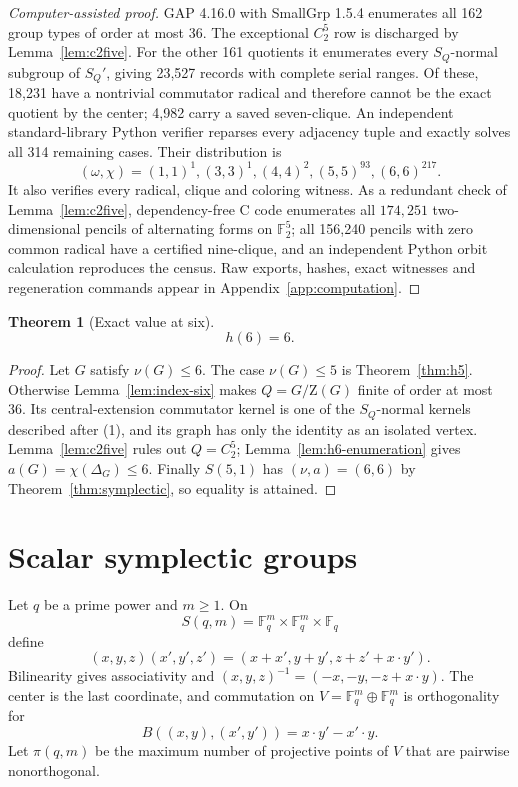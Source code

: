 \documentclass[11pt]{article}
\newtheorem{theorem}{Theorem}[section]
\theoremstyle{remark}
\newcommand{\nuG}{\nu}
\newcommand{\aG}{a}
\newcommand{\F}{\mathbb F}
\newcommand{\Z}{\mathrm Z}
\begin{document}
\begin{proof}[Computer-assisted proof]
GAP 4.16.0 with SmallGrp 1.5.4 enumerates all 162 group types of order at
most 36.  The exceptional $C_2^5$ row is discharged by
Lemma~\ref{lem:c2five}.  For the other 161 quotients it enumerates every
$S_Q$-normal subgroup of $S_Q'$, giving 23,527 records with complete serial
ranges.  Of these, 18,231 have a nontrivial commutator radical and therefore
cannot be the exact quotient by the center; 4,982 carry a saved seven-clique.
An independent standard-library Python verifier reparses every adjacency
tuple and exactly solves all 314 remaining cases.  Their distribution is
\[
 (\omega,\chi)=(1,1)^1,(3,3)^1,(4,4)^2,(5,5)^{93},(6,6)^{217}.
\]
It also verifies every radical, clique and coloring witness.  As a redundant
check of Lemma~\ref{lem:c2five}, dependency-free C code enumerates all
$174{,}251$ two-dimensional pencils of alternating forms on $\F_2^5$; all
156,240 pencils with zero common radical have a certified nine-clique, and
an independent Python orbit calculation reproduces the census.  Raw exports,
hashes, exact witnesses and regeneration commands appear in
Appendix~\ref{app:computation}.
\end{proof}

\begin{theorem}[Exact value at six]\label{thm:h6}
\[
 h(6)=6.
\]
\end{theorem}

\begin{proof}
Let $G$ satisfy $\nuG(G)\le6$.  The case $\nuG(G)\le5$ is
Theorem~\ref{thm:h5}.  Otherwise Lemma~\ref{lem:index-six} makes
$Q=G/\Z(G)$ finite of order at most 36.  Its central-extension commutator
kernel is one of the $S_Q$-normal kernels described after (1), and its graph
has only the identity as an isolated vertex.  Lemma~\ref{lem:c2five} rules
out $Q=C_2^5$; Lemma~\ref{lem:h6-enumeration} gives
$\aG(G)=\chi(\Delta_G)\le6$.  Finally $S(5,1)$ has
$(\nuG,\aG)=(6,6)$ by Theorem~\ref{thm:symplectic}, so equality is attained.
\end{proof}

\section{Scalar symplectic groups}

Let $q$ be a prime power and $m\ge1$.  On
\[
 S(q,m)=\F_q^m\times\F_q^m\times\F_q
\]
define
\[
 (x,y,z)(x',y',z')=(x+x',y+y',z+z'+x\mathbin\cdot y').
\]
Bilinearity gives associativity and
$(x,y,z)^{-1}=(-x,-y,-z+x\cdot y)$.  The center is the last coordinate,
and commutation on $V=\F_q^m\oplus\F_q^m$ is orthogonality for
\[
 B((x,y),(x',y'))=x\cdot y'-x'\cdot y.
\]
Let $\pi(q,m)$ be the maximum number of projective points of $V$ that are
pairwise nonorthogonal.
\end{document}
